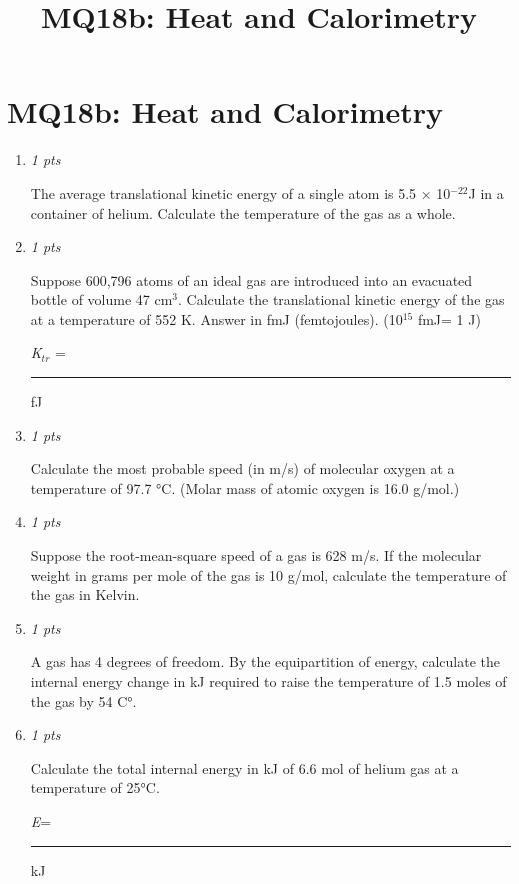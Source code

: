 \documentclass[11pt]{article}
\title{MQ18b: Heat and Calorimetry}
\author{}
\date{}
\begin{document}
\maketitle

\section*{MQ18b: Heat and Calorimetry}

\begin{enumerate}[leftmargin=*,label=\textbf{Question \arabic*.}]

\item \hfill \textit{1 pts}

The average translational kinetic energy of a single atom is 5.5 × 10$^{-22}$J in a container of helium. Calculate the temperature of the gas as a whole.

\item \hfill \textit{1 pts}

Suppose 600,796 atoms of an ideal gas are introduced into an evacuated bottle of volume 47 cm$^{3}$. Calculate the translational kinetic energy of the gas at a temperature of 552 K. Answer in fmJ (femtojoules). (10$^{15}$ fmJ= 1 J)



\emph{K}$_{tr}$ = \rule{2.5cm}{0.4pt} fJ

\item \hfill \textit{1 pts}

Calculate the most probable speed (in m/s) of molecular oxygen at a temperature of 97.7 °C. (Molar mass of atomic oxygen is 16.0 g/mol.)

\item \hfill \textit{1 pts}

Suppose the root-mean-square speed of a gas is 628 m/s. If the molecular weight in grams per mole of the gas is 10 g/mol, calculate the temperature of the gas in Kelvin.

\item \hfill \textit{1 pts}

A gas has 4 degrees of freedom. By the equipartition of energy, calculate the internal energy change in kJ required to raise the temperature of 1.5 moles of the gas by 54 C°.

\item \hfill \textit{1 pts}

Calculate the total internal energy in kJ of 6.6 mol of helium gas at a temperature of 25°C.



\emph{E}= \rule{2.5cm}{0.4pt} kJ

\end{enumerate}
\end{document}
